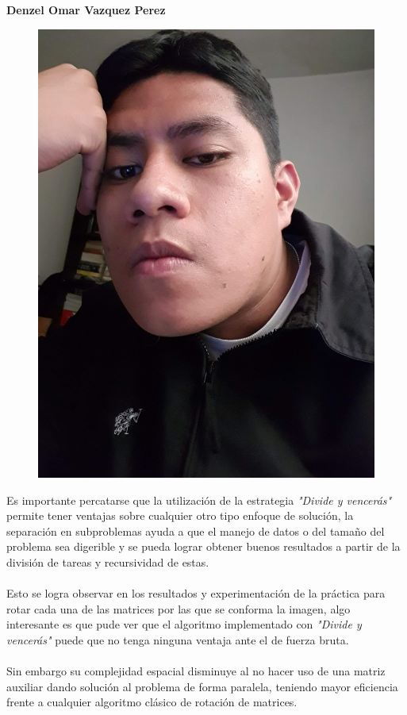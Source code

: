 \documentclass[12pt,twoside]{article}
\begin{document}
    \newpage
    \textbf{\large Denzel Omar Vazquez Perez}
        \begin{figure}[H]
            \centering
            \includegraphics[angle=-90, scale= 0.05]{imagenes/foto2.jpg}
        \end{figure}
        Es importante percatarse que la utilizaci\'on de la estrategia {\it "Divide y vencer\'as"} permite tener ventajas sobre cualquier otro tipo enfoque de soluci\'on, la separaci\'on en subproblemas ayuda a que el manejo de datos o del tama\~no del problema sea digerible y se pueda lograr obtener buenos resultados a partir de la divisi\'on de tareas y recursividad de estas.\\
        \\
        Esto se logra observar en los resultados y experimentaci\'on de la pr\'actica para rotar cada una de las matrices por las que se conforma la imagen, algo interesante es que pude ver que el algoritmo implementado con {\it "Divide y vencer\'as"} puede que no tenga ninguna ventaja ante el de fuerza bruta.\\
        \\
        Sin embargo su complejidad espacial disminuye al no hacer uso de una matriz auxiliar dando soluci\'on al problema de forma paralela, teniendo mayor eficiencia frente a cualquier algoritmo cl\'asico de rotaci\'on de matrices.
    \newpage
\end{document}
